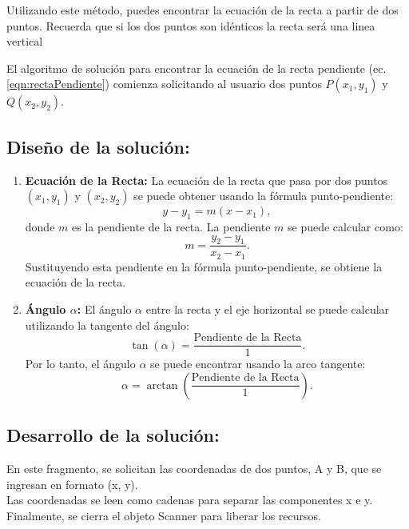 Utilizando este método, puedes encontrar la ecuación de la recta a partir de dos puntos. Recuerda que si los dos puntos son idénticos la recta será una linea vertical \cite{rectaPendiente}

El algoritmo de solución para encontrar la ecuación de la recta pendiente  (ec. \ref{eqn:rectaPendiente}) comienza solicitando al usuario dos puntos $P(x_{1}, y_{1})$ y $Q(x_{2}, y_{2})$.

\subsection{\textbf{Diseño de la solución:}}
\begin{enumerate}
    \item \textbf{Ecuación de la Recta:} La ecuación de la recta que pasa por dos puntos $(x_{1}, y_{1})$ y $(x_{2}, y_{2})$ se puede obtener usando la fórmula punto-pendiente:
    \begin{equation*}
        y - y_{1} = m(x - x_{1}),
    \end{equation*}
    donde $m$ es la pendiente de la recta. La pendiente $m$ se puede calcular como:
    \begin{equation*}
        m = \frac{y_{2} - y_{1}}{x_{2} - x_{1}}.
    \end{equation*}
    Sustituyendo esta pendiente en la fórmula punto-pendiente, se obtiene la ecuación de la recta.

    \item \textbf{Ángulo $\alpha$:} El ángulo $\alpha$ entre la recta y el eje horizontal se puede calcular utilizando la tangente del ángulo:
    \begin{equation*}
        \tan(\alpha) = \frac{\text{Pendiente de la Recta}}{1}.
    \end{equation*}
    Por lo tanto, el ángulo $\alpha$ se puede encontrar usando la arco tangente:
    \begin{equation*}
        \alpha = \arctan\left(\frac{\text{Pendiente de la Recta}}{1}\right).
    \end{equation*}
\end{enumerate}

\subsection{\textbf{Desarrollo de la solución:}}
En este fragmento, se solicitan las coordenadas de dos puntos, A y B, que se ingresan en formato (x, y). \\
Las coordenadas se leen como cadenas para separar las componentes x e y.\\ Finalmente, se cierra el objeto Scanner para liberar los recursos.

